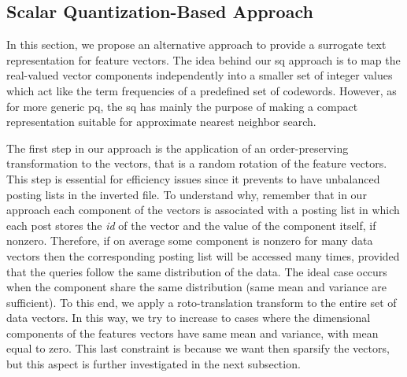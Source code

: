 \subsection{Scalar Quantization-Based Approach}
\label{subsec:str:sq}
In this section, we propose an alternative approach to provide a surrogate text representation for feature vectors.
The idea behind our \gls{sq} approach is to map the real-valued vector components independently into a smaller set of integer values which act like the term frequencies of a predefined set of codewords.
However, as for more generic \gls{pq}, the \gls{sq} has mainly the purpose of making a compact representation suitable for approximate nearest neighbor search.

The first step in our approach is the application of an order-preserving transformation to the vectors, that is a random rotation of the feature vectors.
This step is essential for efficiency issues since it prevents to have unbalanced posting lists in the inverted file.
To understand why, remember that in our approach each component of the vectors is associated with a posting list in which each post stores the \emph{id} of the vector and the value of the component itself, if nonzero.
Therefore, if on average some component is nonzero for many data vectors then the corresponding posting list will be accessed many times, provided that the queries follow the same distribution of the data.
The ideal case occurs when the component share the same distribution (same mean and variance are sufficient).
To this end, we apply a roto-translation transform to the entire set of data vectors.
In this way, we try to increase to cases where the dimensional components of the features vectors have same mean and variance, with mean equal to zero.
This last constraint is because we want then sparsify the vectors, but this aspect is further investigated in the next subsection.

